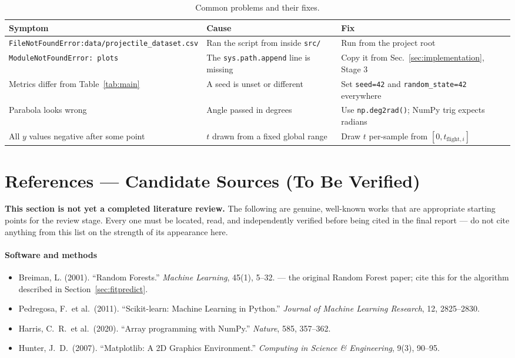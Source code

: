 \documentclass[11pt,a4paper]{article}
\begin{document}
\begin{table}[h]
\centering
\small
\caption{Common problems and their fixes.}
\begin{tabular}{@{}p{4.6cm}p{4.4cm}p{5.2cm}@{}}
\toprule
\textbf{Symptom} & \textbf{Cause} & \textbf{Fix} \\
\midrule
\texttt{FileNotFoundError:}\newline\texttt{data/projectile\_dataset.csv} &
  Ran the script from inside \texttt{src/} & Run from the project root \\
\texttt{ModuleNotFoundError: plots} &
  The \texttt{sys.path.append} line is missing & Copy it from Sec.~\ref{sec:implementation}, Stage 3 \\
Metrics differ from Table~\ref{tab:main} &
  A seed is unset or different & Set \texttt{seed=42} and \texttt{random\_state=42} everywhere \\
Parabola looks wrong &
  Angle passed in degrees & Use \texttt{np.deg2rad()}; NumPy trig expects radians \\
All $y$ values negative after some point &
  $t$ drawn from a fixed global range & Draw $t$ per-sample from $[0,t_{\text{flight},i}]$ \\
\bottomrule
\end{tabular}
\end{table}

\section{References --- Candidate Sources (To Be Verified)}\label{sec:refs}

\textbf{This section is not yet a completed literature review.} The following are genuine,
well-known works that are appropriate starting points for the review stage. Every one must be
located, read, and independently verified before being cited in the final report --- do not cite
anything from this list on the strength of its appearance here.

\paragraph{Software and methods}
\begin{itemize}[leftmargin=2em,itemsep=0.15em]
  \item Breiman, L. (2001). ``Random Forests.'' \emph{Machine Learning}, 45(1), 5--32. --- the
        original Random Forest paper; cite this for the algorithm described in
        Section~\ref{sec:fitpredict}.
  \item Pedregosa, F.\ et al.\ (2011). ``Scikit-learn: Machine Learning in Python.''
        \emph{Journal of Machine Learning Research}, 12, 2825--2830.
  \item Harris, C.\ R.\ et al.\ (2020). ``Array programming with NumPy.'' \emph{Nature}, 585,
        357--362.
  \item Hunter, J.\ D.\ (2007). ``Matplotlib: A 2D Graphics Environment.''
        \emph{Computing in Science \& Engineering}, 9(3), 90--95.
\end{itemize}
\end{document}
